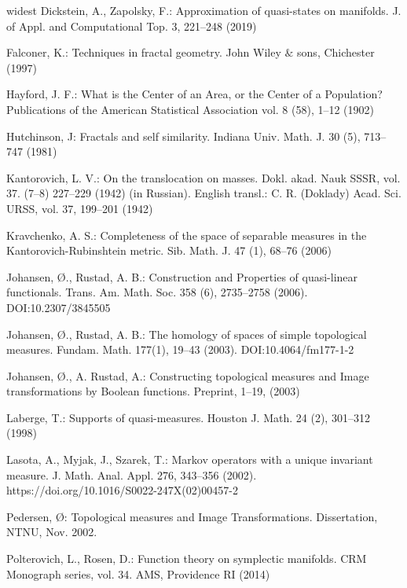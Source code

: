 \documentclass[sn-mathphys-num]{sn-jnl}%
\theoremstyle{thmstyleone}%
\theoremstyle{definition}
\begin{document}
\begin{thebibliography}{widest}
 Dickstein, A.,  Zapolsky, F.:  Approximation of quasi-states on manifolds.  J. of Appl. and Computational Top. 3, 221--248 (2019)  
 
 Falconer, K.:  Techniques in fractal geometry.  John Wiley $\&$ sons, Chichester (1997)
 
 Hayford, J. F.: What is the Center of an Area, or the Center of a Population? Publications of the American Statistical Association 
vol. 8 (58), 1--12 (1902)
 
Hutchinson, J:  Fractals and self similarity. Indiana Univ. Math. J. 30 (5), 713--747 (1981)
  
 Kantorovich,  L. V.:  On the translocation on masses.  Dokl.  akad. Nauk SSSR,  vol. 37. (7--8)  227--229 (1942)  (in Russian). 
 English transl.: C. R. (Doklady) Acad. Sci. URSS,  vol. 37, 199--201 (1942)
 
 Kravchenko, A. S.: Completeness of the space of separable measures in the  Kantorovich-Rubinshtein metric.  Sib. Math. 
 J. 47 (1),  68--76 (2006)
 
  Johansen,  {{\O{}}}.,  Rustad, A. B.:  Construction and Properties of quasi-linear functionals. 
 Trans. Am. Math. Soc. 358 (6), 2735--2758 (2006). DOI:10.2307/3845505 

   Johansen, {{\O{}}}.,   Rustad, A. B.:  The homology of spaces of simple topological measures. Fundam. Math. 177(1), 
   19--43 (2003). DOI:10.4064/fm177-1-2
  
   Johansen,  {{\O{}}}.,  A. Rustad, A.:  Constructing topological measures and Image transformations by Boolean functions.
 Preprint, 1--19, (2003)
    
   Laberge, T.: Supports of quasi-measures.  Houston J. Math. 24 (2), 301--312 (1998)
   
 Lasota, A.,   Myjak, J.,  Szarek, T.:  Markov operators with a unique invariant measure. J. Math. Anal. Appl. 276, 343--356 (2002). 
 https://doi.org/10.1016/S0022-247X(02)00457-2
   
Pedersen, {{\O{}}}: Topological measures and Image Transformations. Dissertation, NTNU, Nov. 2002.
  
 Polterovich, L., Rosen, D.:  Function theory on symplectic manifolds. CRM Monograph series, vol. 34.  AMS, Providence RI (2014)
  

\end{thebibliography}
\end{document}
